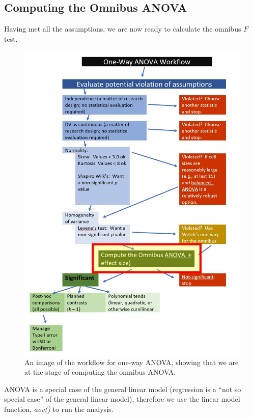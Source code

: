 \documentclass[
  11pt,
]{book}
\begin{document}
\hypertarget{computing-the-omnibus-anova}{%
\subsection{Computing the Omnibus ANOVA}\label{computing-the-omnibus-anova}}

Having met all the assumptions, we are now ready to calculate the omnibus \(F\) test.

\begin{figure}
\centering
\includegraphics{images/oneway/OnewayWrkFlw_omnibus.jpg}
\caption{An image of the workflow for one-way ANOVA, showing that we are at the stage of computing the omnibus ANOVA.}
\end{figure}

ANOVA is a special case of the general linear model (regression is a ``not so special case'' of the general linear model), therefore we use the linear model function, \emph{aov()} to run the analysis.
\end{document}
